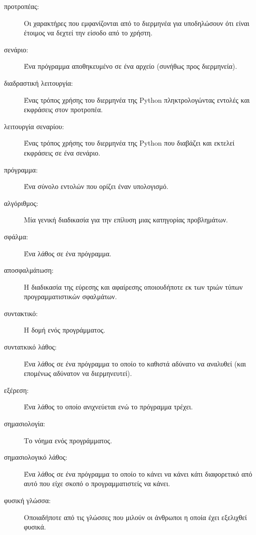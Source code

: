 \documentclass[10pt]{book}
\newcommand{\en}{\selectlanguage{english}}
\newcommand{\gr}{\selectlanguage{greek}}
\begin{document}
\begin{description}
\item[προτροπέας:] Οι χαρακτήρες που εμφανίζονται από το διερμηνέα για
	υποδηλώσουν ότι είναι έτοιμος να δεχτεί την είσοδο από το χρήστη.

\item[σενάριο:] Ένα πρόγραμμα αποθηκευμένο σε ένα αρχείο (συνήθως προς
	διερμηνεία).

\item[διαδραστική λειτουργία:] Ένας τρόπος χρήσης του διερμηνέα της
	\en Python \gr πληκτρολογώντας εντολές και εκφράσεις στον προτροπέα.

\item[λειτουργία σεναρίου:] Ένας τρόπος χρήσης του διερμηνέα της \en
	Python \gr που διαβάζει και εκτελεί εκφράσεις σε ένα σενάριο.

\item[πρόγραμμα:] Ένα σύνολο εντολών που ορίζει έναν υπολογισμό.

\item[αλγόριθμος:]  Μία γενική διαδικασία για την επίλυση μιας κατηγορίας
	προβλημάτων.

\item[σφάλμα:]  Ένα λάθος σε ένα πρόγραμμα.

\item[αποσφαλμάτωση:]  Η διαδικασία της εύρεσης και αφαίρεσης οποιουδήποτε
	εκ των τριών τύπων προγραμματιστικών σφαλμάτων.

\item[συντακτικό:]  Η δομή ενός προγράμματος.

\item[συντατκικό λάθος:]  Ένα λάθος σε ένα πρόγραμμα το οποίο το καθιστά
	αδύνατο να αναλυθεί (και επομένως αδύνατον να διερμηνευτεί).

\item[εξέρεση:]  Ένα λάθος το οποίο ανιχνεύεται ενώ το πρόγραμμα τρέχει.

\item[σημασιολογία:]  Το νόημα ενός προγράμματος.

\item[σημασιολογικό λάθος:]   Ένα λάθος σε ένα πρόγραμμα το οποίο το κάνει
	να κάνει κάτι διαφορετικό από αυτό που είχε σκοπό ο προγραμματιστείς να κάνει.

\item[φυσική γλώσσα:]  Οποιαδήποτε από τις γλώσσες που μιλούν οι άνθρωποι
	η οποία έχει εξελιχθεί φυσικά.


\end{description}
\end{document}
